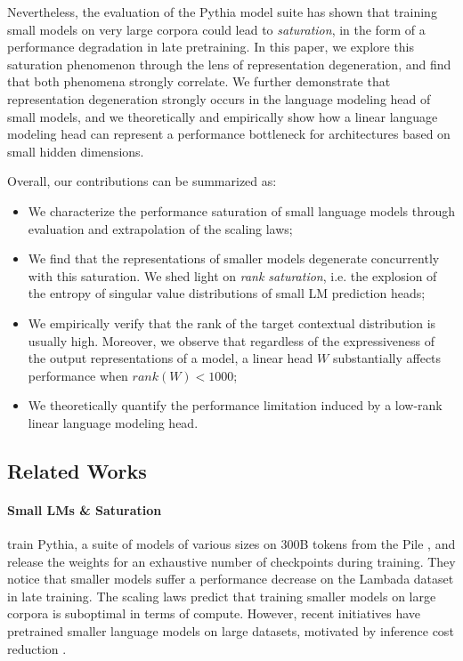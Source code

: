 Nevertheless, the evaluation of the Pythia model suite \citep{biderman2023pythia} has shown that training small models on very large corpora could lead to \textit{saturation}, in the form of a performance degradation in late pretraining. In this paper, we explore this saturation phenomenon through the lens of representation degeneration, and find that both phenomena strongly correlate. We further demonstrate that representation degeneration strongly occurs in the language modeling head of small models, and we theoretically and empirically show how a linear language modeling head can represent a performance bottleneck for architectures based on small hidden dimensions.

Overall, our contributions can be summarized as:
\begin{itemize}
    \item We characterize the performance saturation of small language models through evaluation and extrapolation of the scaling laws;
    \item We find that the representations of smaller models degenerate concurrently with this saturation. We shed light on \textit{rank saturation}, i.e. the explosion of the entropy of singular value distributions of small LM prediction heads;
    \item We empirically verify that the rank of the target contextual distribution is usually
    high. Moreover, we observe that regardless of the expressiveness of the output
    representations of a model, a linear head $W$ substantially affects performance when
    $rank(W) < 1000$;
    \item We theoretically quantify the performance limitation induced by a low-rank linear language modeling head.
\end{itemize}


\subsection{Related Works}
\paragraph{Small LMs \& Saturation} \citet{biderman2023pythia} train Pythia, a suite of models of various sizes on 300B tokens from the Pile \citep{gao2020pile}, and release the weights for an exhaustive number of checkpoints during training. They notice that smaller models suffer a performance decrease on the Lambada dataset \citep{lambada} in late training. The scaling laws \citep{kaplan_scaling,chinchilla_scaling} predict that training smaller models on large corpora is suboptimal in terms of compute. However, recent initiatives \citep{tinyllama,faysse2024croissantllm,gemmateam2024gemma} have pretrained smaller language models on large datasets, motivated by inference cost reduction \citep{beyond_chinchilla}.

